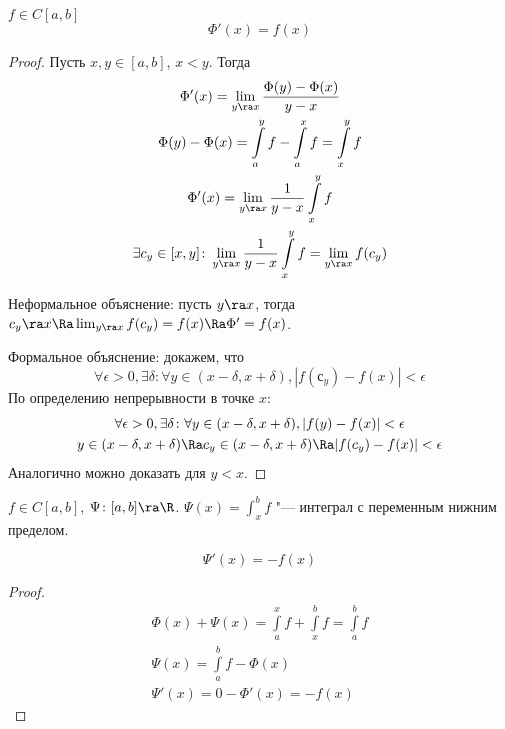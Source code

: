 \begin{theorem}[Барроу]
	$f \in C[a, b]$
	\[\Phi'(x) = f(x)\]
\end{theorem}
\begin{proof}
	Пусть $x, y \in [a, b]$, $x < y$.
	Тогда
	\begin{gather*}
		\Phi'(x) = \lim_{y \ra x} \frac{\Phi (y) - \Phi(x)}{y - x} \\
		\Phi (y) - \Phi (x) = \int\limits_a^y f - \int\limits_a^x f = \int\limits_x^y f \\
		\Phi' (x) = \lim_{y \ra x} \frac{1}{y - x} \int\limits_x^y f \\
		\exists c_y \in [x, y]\colon \lim_{y \ra x} \frac{1}{y - x} \int\limits_x^y f = \lim_{y \ra x} f(c_y)
	\end{gather*}

	Неформальное объяснение: пусть $y \ra x$, тогда $c_y \ra x \Ra \lim_{y \ra x} f(c_y) = f(x) \Ra \Phi' = f(x)$.

	Формальное объяснение: докажем, что
	\[ \forall \epsilon > 0, \exists \delta\colon \forall y \in (x - \delta, x + \delta), |f(с_y) - f(x)| < \epsilon \]
	По определению непрерывности в точке $x$:
	\begin{gather*}
		\forall \epsilon > 0, \exists \delta\colon \forall y \in (x - \delta, x + \delta), |f(y) - f(x)| < \epsilon \\
		y \in (x - \delta, x + \delta) \Ra c_y \in (x - \delta, x + \delta) \Ra |f(c_y) - f(x)| < \epsilon
	 \end{gather*}
	Аналогично можно доказать для $y < x$.
\end{proof}

\begin{Def}
	$f \in C[a, b]$, $\Psi \colon [a, b] \ra \R$.
	$\Psi (x) = \int_x^b f$ "--- интеграл с переменным нижним пределом.
\end{Def}

\begin{conseq}
	\[ \Psi'(x) = -f(x) \]
\end{conseq}
\begin{proof}
	\begin{gather*}
		\Phi (x) + \Psi (x) = \int\limits_a^x f + \int\limits_x^b f = \int\limits_a^b f \\
		\Psi(x) = \int\limits_a^b f - \Phi(x)\\
		\Psi'(x) =  0 - \Phi'(x) = -f(x)
	\end{gather*}
\end{proof}


